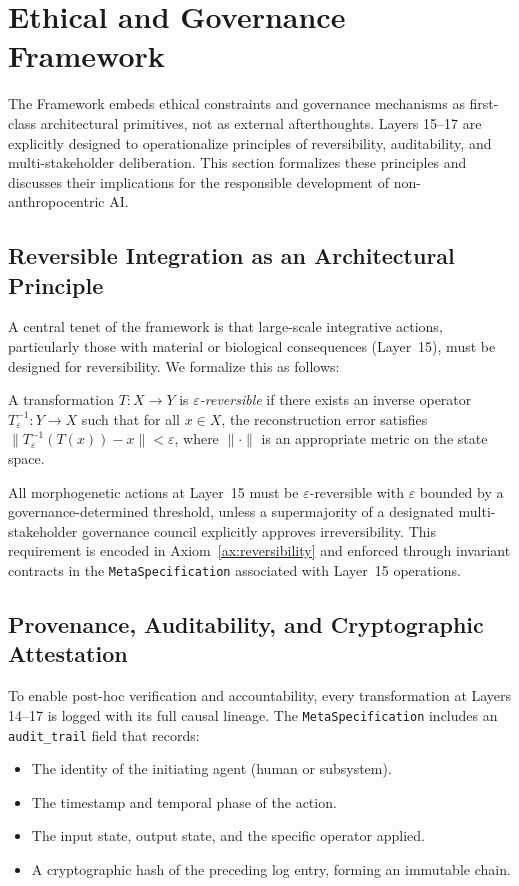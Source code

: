 \section{Ethical and Governance Framework}
\label{sec:ethics}

The \Apeiron{} Framework embeds ethical constraints and governance mechanisms as first-class architectural primitives, not as external afterthoughts. Layers 15--17 are explicitly designed to operationalize principles of reversibility, auditability, and multi-stakeholder deliberation. This section formalizes these principles and discusses their implications for the responsible development of non-anthropocentric AI.

\subsection{Reversible Integration as an Architectural Principle}

A central tenet of the framework is that large-scale integrative actions, particularly those with material or biological consequences (Layer~15), must be designed for reversibility. We formalize this as follows:

\begin{definition}
A transformation $T: X \to Y$ is \emph{$\varepsilon$-reversible} if there exists an inverse operator $T^{-1}_\varepsilon: Y \to X$ such that for all $x \in X$, the reconstruction error satisfies $\|T^{-1}_\varepsilon(T(x)) - x\| < \varepsilon$, where $\|\cdot\|$ is an appropriate metric on the state space.
\end{definition}

All morphogenetic actions at Layer~15 must be $\varepsilon$-reversible with $\varepsilon$ bounded by a governance-determined threshold, unless a supermajority of a designated multi-stakeholder governance council explicitly approves irreversibility. This requirement is encoded in Axiom~\ref{ax:reversibility} and enforced through invariant contracts in the \texttt{MetaSpecification} associated with Layer~15 operations.

\subsection{Provenance, Auditability, and Cryptographic Attestation}

To enable post-hoc verification and accountability, every transformation at Layers 14--17 is logged with its full causal lineage. The \texttt{MetaSpecification} includes an \texttt{audit\_trail} field that records:
\begin{itemize}
    \item The identity of the initiating agent (human or subsystem).
    \item The timestamp and temporal phase of the action.
    \item The input state, output state, and the specific operator applied.
    \item A cryptographic hash of the preceding log entry, forming an immutable chain.
\end{itemize}

